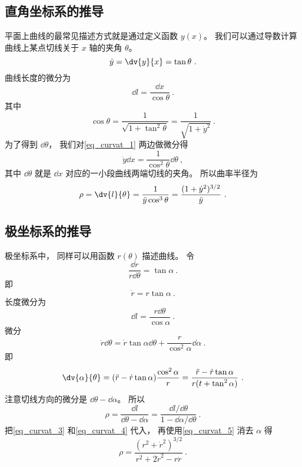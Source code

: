 \subsection{直角坐标系的推导}
平面上曲线的最常见描述方式就是通过定义函数 $y(x)$。 我们可以通过导数计算曲线上某点切线关于 $x$ 轴的夹角 $\theta$。
\begin{equation}\label{eq_curvat_1}
\dot y = \dv{y}{x} = \tan \theta~.
\end{equation}
曲线长度的微分为
\begin{equation}
\dd{l} = \frac{\dd{x}}{\cos\theta}~.
\end{equation}
其中
\begin{equation}\label{eq_curvat_2}
\cos\theta = \frac{1}{\sqrt{1 + \tan^2\theta}} = \frac{1}{\sqrt{1 + \dot y^2}}~.
\end{equation}
为了得到 $\dd{\theta}$， 我们对\autoref{eq_curvat_1} 两边做微分得
\begin{equation}
\ddot y \dd{x} = \frac{1}{\cos^2\theta} \dd{\theta}~,
\end{equation}
其中 $\dd{\theta}$ 就是 $\dd{x}$ 对应的一小段曲线两端切线的夹角。 所以曲率半径为
\begin{equation}
\rho = \dv{l}{\theta} = \frac{1}{\ddot y\cos^3\theta} = \frac{(1 + \dot y^2)^{3/2}}{\ddot y}~.
\end{equation}

\subsection{极坐标系的推导}
极坐标系中， 同样可以用函数 $r(\theta)$ 描述曲线。
令
\begin{equation}
\frac{\dd{r}}{r \dd{\theta}} = \tan\alpha~.
\end{equation}
即
\begin{equation}\label{eq_curvat_5}
\dot r = r\tan\alpha~.
\end{equation}
长度微分为
\begin{equation}
\dd{l} = \frac{r\dd{\theta}}{\cos\alpha}~.
\end{equation}
微分
\begin{equation}
\ddot r\dd{\theta} = \dot r\tan\alpha\dd{\theta} + \frac{r}{\cos^2\alpha}\dd{\alpha}~.
\end{equation}
即
\begin{equation}\label{eq_curvat_4}
\dv{\alpha}{\theta} = (\ddot r - \dot r \tan\alpha) \frac{\cos^2\alpha}{r} = \frac{\ddot r - \dot r\tan\alpha}{r(t + \tan^2\alpha)}~.
\end{equation}
注意切线方向的微分是 $\dd{\theta} - \dd{\alpha}$。 所以
\begin{equation}
\rho = \frac{\dd{l}}{\dd{\theta} - \dd{\alpha}} = \frac{\dd{l}/\dd{\theta}}{1 - \dd{\alpha}/\dd{\theta}}~.
\end{equation}
把\autoref{eq_curvat_3} 和\autoref{eq_curvat_4} 代入， 再使用\autoref{eq_curvat_5} 消去 $\alpha$ 得
\begin{equation}
\rho = \frac{(r^2 + \dot r^2)^{3/2}}{r^2 + 2\dot r^2 - r\ddot r}~.
\end{equation}
